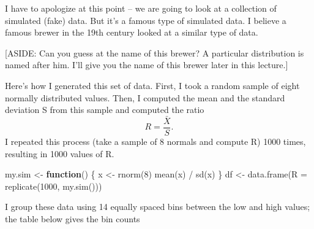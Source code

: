 \documentclass[
]{book}
\newenvironment{Shaded}{\begin{snugshade}}{\end{snugshade}}
\newcommand{\AttributeTok}[1]{\textcolor[rgb]{0.77,0.63,0.00}{#1}}
\newcommand{\ControlFlowTok}[1]{\textcolor[rgb]{0.13,0.29,0.53}{\textbf{#1}}}
\newcommand{\DecValTok}[1]{\textcolor[rgb]{0.00,0.00,0.81}{#1}}
\newcommand{\FunctionTok}[1]{\textcolor[rgb]{0.00,0.00,0.00}{#1}}
\newcommand{\NormalTok}[1]{#1}
\newcommand{\OtherTok}[1]{\textcolor[rgb]{0.56,0.35,0.01}{#1}}
\newcommand{\SpecialCharTok}[1]{\textcolor[rgb]{0.00,0.00,0.00}{#1}}
\begin{document}
I have to apologize at this point -- we are going to look at a collection of simulated (fake) data. But it's a famous type of simulated data. I believe a famous brewer in the 19th century looked at a similar type of data.

{[}ASIDE: Can you guess at the name of this brewer? A particular distribution is named after him. I'll give you the name of this brewer later in this lecture.{]}

Here's how I generated this set of data. First, I took a random sample of eight normally distributed values. Then, I computed the mean and the standard deviation S from this sample and computed the ratio
\[
R = \frac{\bar X}{S}.
\]
I repeated this process (take a sample of 8 normals and compute R) 1000 times, resulting in 1000 values of R.

\begin{Shaded}
\begin{Highlighting}[]
\NormalTok{my.sim }\OtherTok{\textless{}{-}} \ControlFlowTok{function}\NormalTok{() \{}
\NormalTok{    x }\OtherTok{\textless{}{-}} \FunctionTok{rnorm}\NormalTok{(}\DecValTok{8}\NormalTok{)}
    \FunctionTok{mean}\NormalTok{(x) }\SpecialCharTok{/} \FunctionTok{sd}\NormalTok{(x)}
\NormalTok{\}}
\NormalTok{df }\OtherTok{\textless{}{-}} \FunctionTok{data.frame}\NormalTok{(}\AttributeTok{R =} \FunctionTok{replicate}\NormalTok{(}\DecValTok{1000}\NormalTok{, }\FunctionTok{my.sim}\NormalTok{()))}
\end{Highlighting}
\end{Shaded}

I group these data using 14 equally spaced bins between the low and high values; the table below gives the bin counts

\begin{Shaded}
\end{Shaded}
\end{document}
